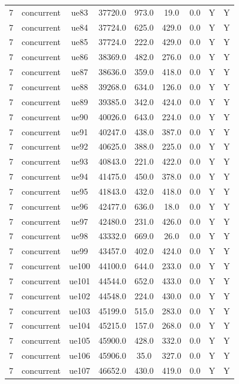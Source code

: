 \begin{table}[ht]
\begin{tabular}{|c|c|c|c|c|c|c|c|c|}
7 & concurrent & ue83 & 37720.0 & 973.0 & 19.0 & 0.0 & Y & Y \\
7 & concurrent & ue84 & 37724.0 & 625.0 & 429.0 & 0.0 & Y & Y \\
7 & concurrent & ue85 & 37724.0 & 222.0 & 429.0 & 0.0 & Y & Y \\
7 & concurrent & ue86 & 38369.0 & 482.0 & 276.0 & 0.0 & Y & Y \\
7 & concurrent & ue87 & 38636.0 & 359.0 & 418.0 & 0.0 & Y & Y \\
7 & concurrent & ue88 & 39268.0 & 634.0 & 126.0 & 0.0 & Y & Y \\
7 & concurrent & ue89 & 39385.0 & 342.0 & 424.0 & 0.0 & Y & Y \\
7 & concurrent & ue90 & 40026.0 & 643.0 & 224.0 & 0.0 & Y & Y \\
7 & concurrent & ue91 & 40247.0 & 438.0 & 387.0 & 0.0 & Y & Y \\
7 & concurrent & ue92 & 40625.0 & 388.0 & 225.0 & 0.0 & Y & Y \\
7 & concurrent & ue93 & 40843.0 & 221.0 & 422.0 & 0.0 & Y & Y \\
7 & concurrent & ue94 & 41475.0 & 450.0 & 378.0 & 0.0 & Y & Y \\
7 & concurrent & ue95 & 41843.0 & 432.0 & 418.0 & 0.0 & Y & Y \\
7 & concurrent & ue96 & 42477.0 & 636.0 & 18.0 & 0.0 & Y & Y \\
7 & concurrent & ue97 & 42480.0 & 231.0 & 426.0 & 0.0 & Y & Y \\
7 & concurrent & ue98 & 43332.0 & 669.0 & 26.0 & 0.0 & Y & Y \\
7 & concurrent & ue99 & 43457.0 & 402.0 & 424.0 & 0.0 & Y & Y \\
7 & concurrent & ue100 & 44100.0 & 644.0 & 233.0 & 0.0 & Y & Y \\
7 & concurrent & ue101 & 44544.0 & 652.0 & 433.0 & 0.0 & Y & Y \\
7 & concurrent & ue102 & 44548.0 & 224.0 & 430.0 & 0.0 & Y & Y \\
7 & concurrent & ue103 & 45199.0 & 515.0 & 283.0 & 0.0 & Y & Y \\
7 & concurrent & ue104 & 45215.0 & 157.0 & 268.0 & 0.0 & Y & Y \\
7 & concurrent & ue105 & 45900.0 & 428.0 & 332.0 & 0.0 & Y & Y \\
7 & concurrent & ue106 & 45906.0 & 35.0 & 327.0 & 0.0 & Y & Y \\
7 & concurrent & ue107 & 46652.0 & 430.0 & 419.0 & 0.0 & Y & Y \\

\end{tabular}
\end{table}
